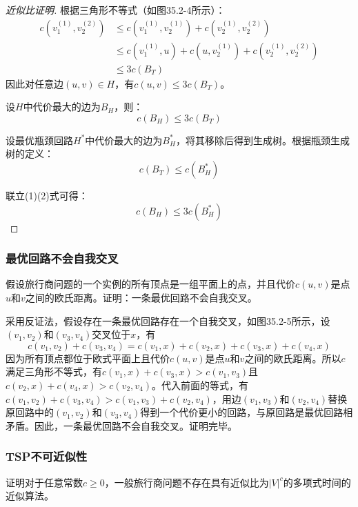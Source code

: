 \documentclass[./../main.tex]{subfiles} %
\begin{document}
\begin{proof}[近似比证明]
根据三角形不等式（如图35.2-4所示）：
\begin{align*}
c(v_1^{(1)}, v_2^{(2)}) &\leq c(v_1^{(1)}, v_2^{(1)}) + c(v_2^{(1)}, v_2^{(2)}) \\
&\leq c(v_1^{(1)}, u) + c(u, v_2^{(1)}) + c(v_2^{(1)}, v_2^{(2)}) \\
&\leq 3c(B_T)
\end{align*}
因此对任意边$(u,v)\in H$，有$c(u,v) \leq 3c(B_T)$。

设$H$中代价最大的边为$B_H$，则：
\begin{equation}
c(B_H) \leq 3c(B_T)
\end{equation}

设最优瓶颈回路$H^*$中代价最大的边为$B_H^*$，将其移除后得到生成树。根据瓶颈生成树的定义：
\begin{equation}
c(B_T) \leq c(B_H^*)
\end{equation}

联立(1)(2)式可得：
\begin{equation*}
c(B_H) \leq 3c(B_H^*)
\end{equation*}
\end{proof}

\subsubsection{最优回路不会自我交叉}
假设旅行商问题的一个实例的所有顶点是一组平面上的点，并且代价$c(u,v)$是点$u$和$v$之间的欧氏距离。证明：一条最优回路不会自我交叉。

采用反证法，假设存在一条最优回路存在一个自我交叉，如图35.2-5所示，设$(v_{1},v_{2})$和$(v_{3},v_{4})$交叉位于$x$，有
$$c(v_{1},v_{2})+c(v_{3},v_{4})=c(v_{1},x)+c(v_{2},x)+c(v_{3},x)+c(v_{4},x)$$
因为所有顶点都位于欧式平面上且代价$c(u,v)$是点$u$和$v$之间的欧氏距离。所以$c$满足三角形不等式，有$c(v_{1},x)+c(v_{3},x)>c(v_{1},v_{3})$且$c(v_{2},x)+c(v_{4},x)>c(v_{2},v_{4})$。代入前面的等式，有$c(v_{1},v_{2})+c(v_{3},v_{4})>c(v_{1},v_{3})+c(v_{2},v_{4})$，用边$(v_{1},v_{3})$和$(v_{2},v_{4})$替换原回路中的$(v_{1},v_{2})$和$(v_{3},v_{4})$得到一个代价更小的回路，与原回路是最优回路相矛盾。因此，一条最优回路不会自我交叉。证明完毕。

\subsubsection{TSP不可近似性}
证明对于任意常数$c \geq 0$，一般旅行商问题不存在具有近似比为$|V|^{c}$的多项式时间的近似算法。
\end{document}
